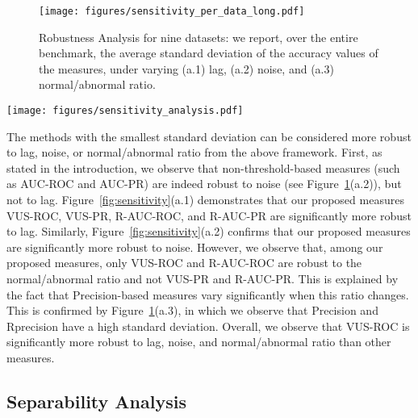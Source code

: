 
\begin{figure}[tb]
  \centering
  \texttt{[image: figures/sensitivity\_per\_data\_long.pdf]}
  \caption{Robustness Analysis for nine datasets: we report, over the entire benchmark, the average standard deviation of the accuracy values of the measures, under varying (a.1) lag, (a.2) noise, and (a.3) normal/abnormal ratio. }
  \label{fig:sensitivity_per_data}
\end{figure}

\begin{figure*}[tb]
  \centering
  \texttt{[image: figures/sensitivity\_analysis.pdf]}
  \caption{Critical difference diagram computed using the signed-rank Wilkoxon test (with $\alpha=0.1$) for the robustness to (a.1) lag, (a.2) noise and (a.3) normal/abnormal ratio.}
  \label{fig:sensitivity}
\end{figure*}

The methods with the smallest standard deviation can be considered more robust to lag, noise, or normal/abnormal ratio from the above framework. 
First, as stated in the introduction, we observe that non-threshold-based measures (such as AUC-ROC and AUC-PR) are indeed robust to noise (see Figure~\ref{fig:sensitivity_per_data}(a.2)), but not to lag. Figure~\ref{fig:sensitivity}(a.1) demonstrates that our proposed measures VUS-ROC, VUS-PR, R-AUC-ROC, and R-AUC-PR are significantly more robust to lag. Similarly, Figure~\ref{fig:sensitivity}(a.2) confirms that our proposed measures are significantly more robust to noise. However, we observe that, among our proposed measures, only VUS-ROC and R-AUC-ROC are robust to the normal/abnormal ratio and not VUS-PR and R-AUC-PR. This is explained by the fact that Precision-based measures vary significantly when this ratio changes. This is confirmed by Figure~\ref{fig:sensitivity_per_data}(a.3), in which we observe that Precision and Rprecision have a high standard deviation. Overall, we observe that VUS-ROC is significantly more robust to lag, noise, and normal/abnormal ratio than other measures.




\subsection{Separability Analysis}
\label{exp:separability}

